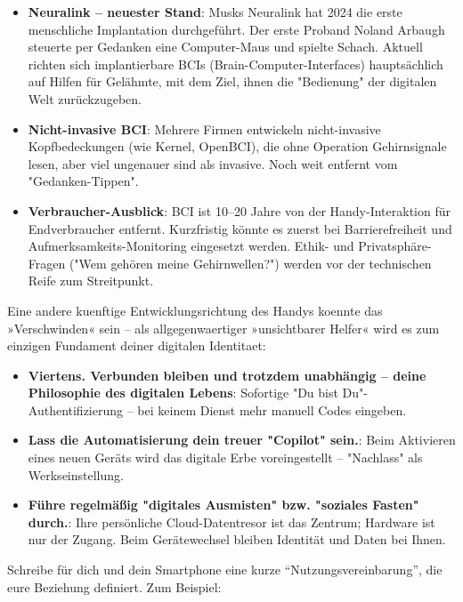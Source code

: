 \begin{itemize}
  \item \textbf{Neuralink – neuester Stand}: Musks Neuralink hat 2024 die erste menschliche Implantation durchgeführt. Der erste Proband Noland Arbaugh steuerte per Gedanken eine Computer-Maus und spielte Schach. Aktuell richten sich implantierbare BCIs (Brain-Computer-Interfaces) hauptsächlich auf Hilfen für Gelähmte, mit dem Ziel, ihnen die "Bedienung" der digitalen Welt zurückzugeben.
  \item \textbf{Nicht-invasive BCI}: Mehrere Firmen entwickeln nicht-invasive Kopfbedeckungen (wie Kernel, OpenBCI), die ohne Operation Gehirnsignale lesen, aber viel ungenauer sind als invasive. Noch weit entfernt vom "Gedanken-Tippen".
  \item \textbf{Verbraucher-Ausblick}: BCI ist 10–20 Jahre von der Handy-Interaktion für Endverbraucher entfernt. Kurzfristig könnte es zuerst bei Barrierefreiheit und Aufmerksamkeits-Monitoring eingesetzt werden. Ethik- und Privatsphäre-Fragen ("Wem gehören meine Gehirnwellen?") werden vor der technischen Reife zum Streitpunkt.
\end{itemize}


Eine andere kuenftige Entwicklungsrichtung des Handys koennte das »Verschwinden« sein – als allgegenwaertiger »unsichtbarer Helfer« wird es zum einzigen Fundament deiner digitalen Identitaet:

\begin{itemize}
  \item \textbf{Viertens. Verbunden bleiben und trotzdem unabhängig – deine Philosophie des digitalen Lebens}: Sofortige "Du bist Du"-Authentifizierung – bei keinem Dienst mehr manuell Codes eingeben.
  \item \textbf{Lass die Automatisierung dein treuer "Copilot" sein.}: Beim Aktivieren eines neuen Geräts wird das digitale Erbe voreingestellt – "Nachlass" als Werkseinstellung.
  \item \textbf{Führe regelmäßig "digitales Ausmisten" bzw. "soziales Fasten" durch.}: Ihre persönliche Cloud-Datentresor ist das Zentrum; Hardware ist nur der Zugang. Beim Gerätewechsel bleiben Identität und Daten bei Ihnen.
\end{itemize}


Schreibe für dich und dein Smartphone eine kurze “Nutzungsvereinbarung”, die eure Beziehung definiert. Zum Beispiel:

